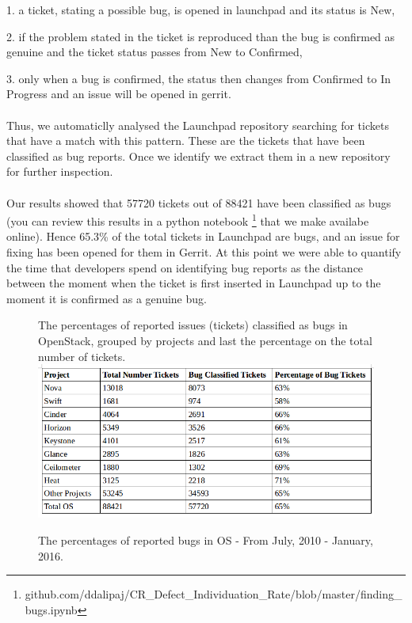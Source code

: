 \documentclass[ifip]{svmult}
\begin{document}
1. a ticket, stating a possible bug, is opened in launchpad and its status is New,

2. if the problem stated in the ticket is reproduced than the bug is confirmed as genuine and the 
ticket status passes from New to Confirmed,

3. only when a bug is confirmed, the status then changes from Confirmed to In Progress and 
an issue will be opened in gerrit.
\\
\\
Thus, we automaticlly analysed the Launchpad repository searching for tickets that have a match with this pattern. 
These are the tickets that have been classified as bug reports. Once we identify we extract them in a new repository for further 
inspection.   
\\
\\
Our results showed that \/ 57720 tickets out of 88421 have been classified as bugs 
(you can review this results in a python notebook 
\footnote{github.com/ddalipaj/CR\_Defect\_Individuation\_Rate/blob/master/finding\_bugs.ipynb} 
that we make availabe online). 
Hence 65.3\% of the total tickets in Launchpad are bugs, and an issue for fixing has been opened for them in Gerrit. 
At this point we were able to quantify the time that developers spend on identifying bug reports as the distance between 
the moment when the ticket is first inserted in Launchpad up to the moment it is confirmed as a genuine bug.

\begin{figure}[H]
\centering
 The percentages of reported issues (tickets) classified as bugs in OpenStack, grouped by projects and last the percentage 
 on the total number of tickets.
\includegraphics[width=1.0\textwidth,natwidth=786,natheight=360]{bugs_time.png}

\caption{The percentages of reported bugs in OS - From July, 2010 - January, 2016.}
\label{fig:1}       %
\end{figure}
\end{document}
